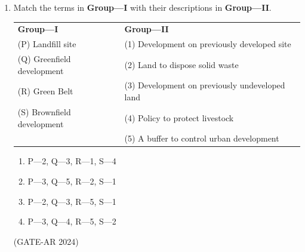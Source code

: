 \documentclass[a4paper,10pt]{article}
\begin{document}
\begin{enumerate}
    \item Match the terms in \textbf{Group—I} with their descriptions in \textbf{Group—II}. \\
    \begin{tabular}{ l l }
    \textbf{Group—I} & \textbf{Group—II} \\
    (P) Landfill site & (1) Development on previously developed site \\
    (Q) Greenfield development & (2) Land to dispose solid waste \\
    (R) Green Belt & (3) Development on previously undeveloped land \\
    (S) Brownfield development & (4) Policy to protect livestock \\
    & (5) A buffer to control urban development \\
    \end{tabular}
    \begin{multicols}{2}
    \begin{enumerate}
        \item P—2, Q—3, R—1, S—4
        \item P—3, Q—5, R—2, S—1
        \item P—2, Q—3, R—5, S—1
        \item P—3, Q—4, R—5, S—2
    \end{enumerate}
    \end{multicols}
    \hfill (GATE-AR 2024)


\end{enumerate}
\end{document}
